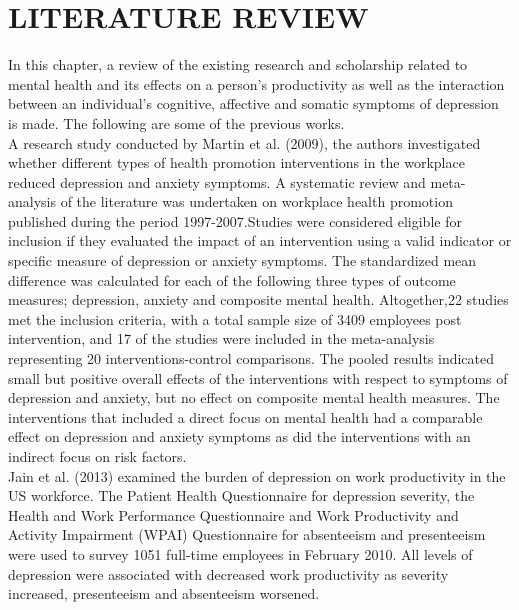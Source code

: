 \documentclass[12pt]{article}
\begin{document}
\section*{LITERATURE REVIEW}
In this chapter, a review of the existing research and scholarship related to mental health and its effects on a person’s productivity as well as the interaction between an individual’s cognitive, affective and somatic symptoms of depression is made. The following are some of the previous works.\\

\noindent A research study conducted by Martin et al. (2009), the authors investigated whether different types of health promotion interventions in the workplace reduced depression and anxiety symptoms. A systematic review and meta-analysis of the literature was undertaken on workplace health promotion published during the period 1997-2007.Studies were considered eligible for inclusion if they evaluated the impact of an intervention using a valid indicator or specific measure of depression or anxiety symptoms. The standardized mean difference was calculated for each of the following three types of outcome measures; depression, anxiety and composite mental health. Altogether,22 studies met the inclusion criteria, with a total sample size of 3409 employees post intervention, and 17 of the studies were included in the meta-analysis representing 20 interventions-control comparisons. The pooled results indicated small but positive overall effects of the interventions with respect to symptoms of depression and anxiety, but no effect on composite mental health measures. The interventions that included a direct focus on mental health had a comparable effect on depression and anxiety symptoms as did the interventions with an indirect focus on risk factors.\\

\noindent Jain et al. (2013) examined the burden of depression on work productivity in the US workforce. The Patient Health Questionnaire for depression severity, the Health and Work Performance Questionnaire and Work Productivity and Activity Impairment (WPAI) Questionnaire for absenteeism and presenteeism were used to survey 1051 full-time employees in February 2010. All levels of depression were associated with decreased work productivity as severity increased, presenteeism and absenteeism worsened.\\
\end{document}
